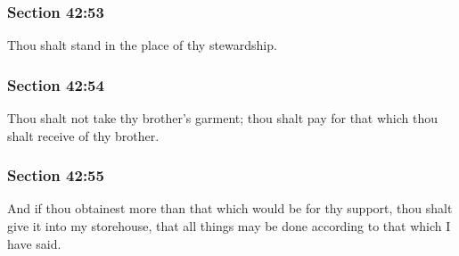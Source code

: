 
	\subsubsection{Section 42:53} %
		\label{DC42-53}

		Thou shalt stand in the place of thy stewardship.


	\subsubsection{Section 42:54} %
		\label{DC42-54}

		Thou shalt not take thy brother's garment; thou shalt pay for that which thou shalt receive of thy brother.


	\subsubsection{Section 42:55} %
		\label{DC42-55}

		And if thou obtainest more than that which would be for thy support, thou shalt give it into my storehouse, that all things may be done according to that which I have said.

